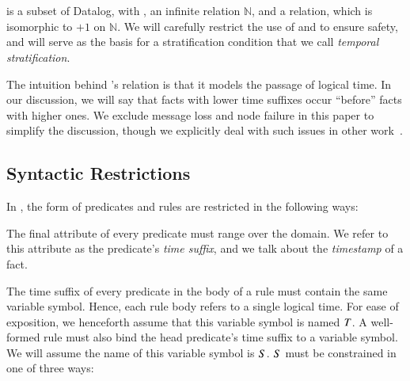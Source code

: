 \section{\lang}

\lang is a subset of Datalog, with , an infinite 
relation $\mathbb{N}$, and a 
relation, which is isomorphic to $+1$ on $\mathbb{N}$.  We will carefully
restrict the use of  and  to ensure safety,
and  will serve as the basis for a stratification condition
that we call {\em temporal stratification}.

The intuition behind \lang's  relation is that it models the
passage of logical time.  In our discussion, we will say that facts with lower
time suffixes occur ``before'' facts with higher ones.  
We exclude message loss and node failure in this paper to simplify the
discussion, though we explicitly deal with such issues in other
work~\cite{dedalus-techr, netdb}.

\subsection{Syntactic Restrictions}
\label{sec:syntaxrestrictions}
In \lang, the form of predicates and rules are restricted in the following ways:

 The final attribute of every \lang
predicate must range over the  domain. 
We refer to this attribute as the predicate's \emph{time suffix}, and we talk about the {\em timestamp} of a fact. 

 The time suffix of every predicate in the
body of a rule must contain the same variable symbol.  Hence, each rule body
refers to a single logical time.  For ease of exposition, we henceforth assume
that this variable symbol is named $\DT$.  A well-formed \lang rule must also
bind the head predicate's time suffix to a variable symbol.  We will assume the
name of this variable symbol is $\DS$. $\DS$ must be constrained in one of
three ways:

